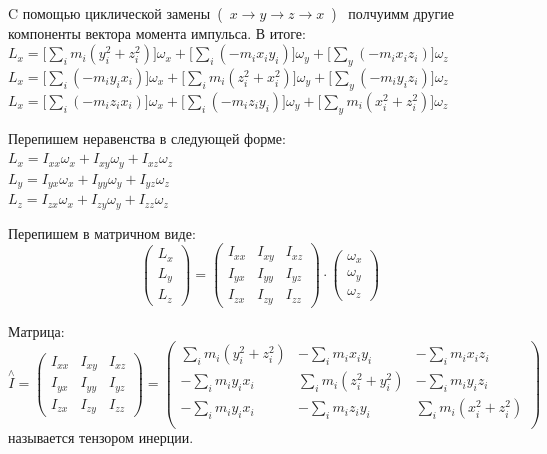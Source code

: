 \documentclass[12pt,a5paper,fleqn]{article}
\begin{document}
\newpage

	C помощью циклической замены~(~$x\rightarrow y\rightarrow z \rightarrow x$~)~ полчуимм другие компоненты вектора момента импульса. В итоге:\\
$L_x = \Big[ \sum_i m_i (y_i^2+z_i^2)\Big]\omega_x + \Big[ \sum_i(-m_ix_iy_i) \Big]\omega_y + \Big[\sum_y(-m_ix_iz_i)\Big]\omega_z $\\
$L_x = \Big[ \sum_i (-m_i y_i x_i)\Big]\omega_x + \Big[ \sum_im_i( z_i^2+x_i^2 ) \Big]\omega_y + \Big[\sum_y(-m_iy_iz_i)\Big]\omega_z $\\
$L_x = \Big[ \sum_i (-m_i z_ix_i)\Big]\omega_x + \Big[ \sum_i(-m_iz_iy_i) \Big]\omega_y + \Big[\sum_y m_i (x_i^2+z_i^2)\Big]\omega_z $

	Перепишем неравенства в следующей форме:\\
$L_x = I_{xx}\omega_x+I_{xy}\omega_y+I_{xz}\omega_z$\\
$L_y = I_{yx}\omega_x+I_{yy}\omega_y+I_{yz}\omega_z$\\
$L_z = I_{zx}\omega_x+I_{zy}\omega_y+I_{zz}\omega_z$

	Перепишем в матричном виде:	
\begin{equation*}
\begin{pmatrix}
L_x \\
L_y \\
L_z 
\end{pmatrix} 	
	=
	\begin{pmatrix}
	I_{xx} & I_{xy} & I_{xz} \\
	I_{yx} & I_{yy} & I_{yz} \\
	I_{zx} & I_{zy} & I_{zz}
	\end{pmatrix} 	
	\cdot	 
	\begin{pmatrix}
	\omega_x \\
	\omega_y \\
	\omega_z 
	\end{pmatrix}
\end{equation*}

Матрица:
\begin{equation*}
\stackrel{\land}{I}
	=
	\begin{pmatrix}
	I_{xx} & I_{xy} & I_{xz} \\
	I_{yx} & I_{yy} & I_{yz} \\
	I_{zx} & I_{zy} & I_{zz}
	\end{pmatrix} 	
		=
		\begin{pmatrix}
		\sum_i m_i (y_i^2+z_i^2) & -\sum_i m_i x_i y_i & 			-\sum_i m_i x_i z_i \\
		-\sum_i m_i y_i x_i & \sum_i m_i (z_i^2+y_i^2) & 
		-\sum_i m_i y_i z_i \\
		-\sum_i m_i y_i x_i & -\sum_i m_i z_i y_i & 
		\sum_i m_i (x_i^2+z_i^2) \\
		\end{pmatrix}
\end{equation*}
называется тензором инерции.
\end{document}
